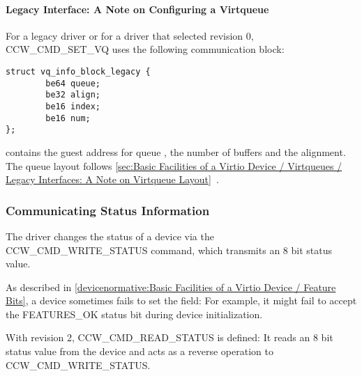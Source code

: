 \paragraph{Legacy Interface: A Note on Configuring a Virtqueue}\label{sec:Virtio Transport Options / Virtio over channel I/O / Device Initialization / Configuring a Virtqueue / Legacy Interface: A Note on Configuring a Virtqueue}

For a legacy driver or for a driver that selected revision 0,
CCW_CMD_SET_VQ uses the following communication block:

\begin{lstlisting}
struct vq_info_block_legacy {
        be64 queue;
        be32 align;
        be16 index;
        be16 num;
};
\end{lstlisting}

 contains the guest address for queue ,  the number of buffers
and  the alignment. The queue layout follows \ref{sec:Basic Facilities of a Virtio Device / Virtqueues / Legacy Interfaces: A Note on Virtqueue Layout}~.

\subsubsection{Communicating Status Information}\label{sec:Virtio Transport Options / Virtio over channel I/O / Device Initialization / Communicating Status Information}

The driver changes the status of a device via the
CCW_CMD_WRITE_STATUS command, which transmits an 8 bit status
value.

As described in
\ref{devicenormative:Basic Facilities of a Virtio Device / Feature Bits},
a device sometimes fails to set the  field: For example, it
might fail to accept the FEATURES_OK status bit during device initialization.

With revision 2, CCW_CMD_READ_STATUS is defined: It reads an 8 bit status
value from the device and acts as a reverse operation to CCW_CMD_WRITE_STATUS.


